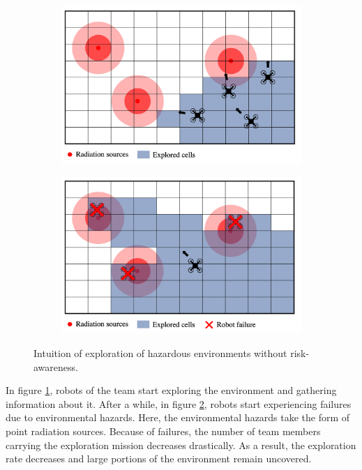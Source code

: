 \begin{figure}[h]
    \centering
    \begin{subfigure}{0.63\textwidth}
        \includegraphics[width=\textwidth]{images/problemStatement1.png}
        \caption{}
        \label{statement1}
    \end{subfigure}
    \begin{subfigure}{0.63\textwidth}
        \includegraphics[width=\textwidth]{images/problemStatement2.png}
        \caption{}
        \label{statement2}
    \end{subfigure}
    \caption{Intuition of exploration of hazardous environments without risk-awareness.}
    \label{statement}
\end{figure}

In figure \ref{statement1}, robots of the team start exploring the environment and gathering information about it. After a while, in figure \ref{statement2}, robots start experiencing failures due to environmental hazards. Here, the environmental hazards take the form of point radiation sources. Because of failures, the number of team members carrying the exploration mission decreases drastically. As a result, the exploration rate decreases and large portions of the environment remain uncovered. 

